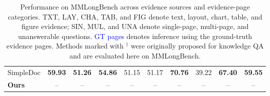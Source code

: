 \begin{table}[h]
\begin{tabular}{lccccc|ccc|c}
SimpleDoc
& \textbf{59.93} & \textbf{51.26} & \textbf{54.86} & 51.15 & 51.17
& \textbf{70.76} & 39.22 & \textbf{67.40} & \textbf{59.55} \\

\textbf{Ours}
& -- & -- & -- & -- & --
& -- & -- & -- & -- \\

\bottomrule
\end{tabular}

\caption{Performance on MMLongBench across evidence sources and evidence-page categories. TXT, LAY, CHA, TAB, and FIG denote text, layout, chart, table, and figure evidence; SIN, MUL, and UNA denote single-page, multi-page, and unanswerable questions. \textcolor{blue}{GT pages} denotes inference using the ground-truth evidence pages. Methods marked with $^{\dagger}$ were originally proposed for knowledge QA and are evaluated here on MMLongBench.}
\label{tab:mmlongbench_method_comparison}
\end{table}
